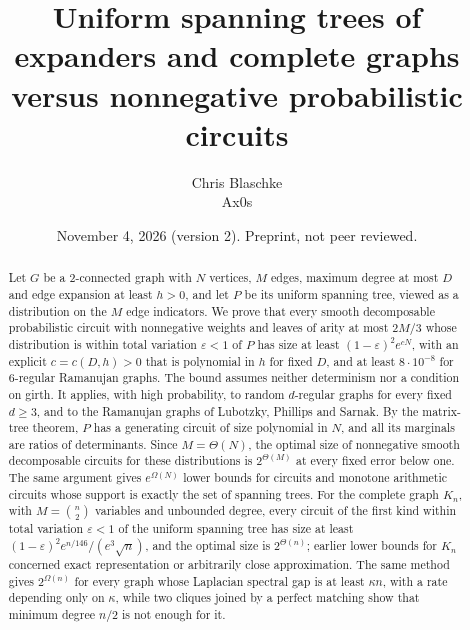 \documentclass[11pt]{article}
\title{Uniform spanning trees of expanders and complete graphs\\ versus nonnegative probabilistic circuits}
\author{Chris Blaschke\\Ax0s}
\date{November 4, 2026 (version 2). Preprint, not peer reviewed.}
\theoremstyle{definition}
\theoremstyle{remark}
\theoremstyle{plain}
\newcommand{\eps}{\varepsilon}
\begin{document}
\maketitle

\begin{abstract}
Let $G$ be a 2-connected graph with $N$ vertices, $M$ edges, maximum degree at most $D$ and edge expansion at least $h>0$, and let $P$ be its uniform spanning tree, viewed as a distribution on the $M$ edge indicators. We prove that every smooth decomposable probabilistic circuit with nonnegative weights and leaves of arity at most $2M/3$ whose distribution is within total variation $\eps<1$ of $P$ has size at least $(1-\eps)^2e^{cN}$, with an explicit $c=c(D,h)>0$ that is polynomial in $h$ for fixed $D$, and at least $8\cdot10^{-8}$ for 6-regular Ramanujan graphs. The bound assumes neither determinism nor a condition on girth. It applies, with high probability, to random $d$-regular graphs for every fixed $d\ge3$, and to the Ramanujan graphs of Lubotzky, Phillips and Sarnak. By the matrix-tree theorem, $P$ has a generating circuit of size polynomial in $N$, and all its marginals are ratios of determinants. Since $M=\Theta(N)$, the optimal size of nonnegative smooth decomposable circuits for these distributions is $2^{\Theta(M)}$ at every fixed error below one. The same argument gives $e^{\Omega(N)}$ lower bounds for circuits and monotone arithmetic circuits whose support is exactly the set of spanning trees. For the complete graph $K_n$, with $M=\binom n2$ variables and unbounded degree, every circuit of the first kind within total variation $\eps<1$ of the uniform spanning tree has size at least $(1-\eps)^2e^{n/146}/(e^3\sqrt n)$, and the optimal size is $2^{\Theta(n)}$; earlier lower bounds for $K_n$ concerned exact representation or arbitrarily close approximation. The same method gives $2^{\Omega(n)}$ for every graph whose Laplacian spectral gap is at least $\kappa n$, with a rate depending only on $\kappa$, while two cliques joined by a perfect matching show that minimum degree $n/2$ is not enough for it.


\end{abstract}
\end{document}
